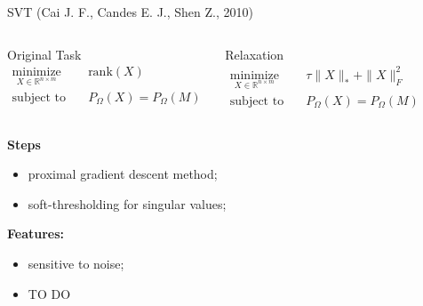 \documentclass{beamer}
\begin{document}
\begin{frame}{SVT (Cai J. F., Candes E. J., Shen Z., 2010)}
	\begin{columns}[c]
		\begin{block}{Original Task}
			\vspace{-0.5cm}
			\begin{align*}
			\mathop{\text{minimize}}\limits_{X \in \mathbb{R}^{n \times m}} \quad & 
			\text{rank} (X) \\
			\text{subject to} \quad & P_{\Omega} (X) = P_{\Omega} (M)
			\end{align*}
		\end{block}
		
		\begin{block}{Relaxation}
			\vspace{-0.5cm}
			\begin{align*}
			\mathop{\text{minimize}}\limits_{X \in \mathbb{R}^{n \times m}} \quad & \tau \| X \|_* + \| X \|_F^2 \\
			\text{subject to} \quad & P_{\Omega} (X) = P_{\Omega} (M)
			\end{align*}
		\end{block}
	\end{columns}
	\vspace{0.3cm}
	\textbf{Steps}
	
	\begin{itemize}
		\item proximal gradient descent method;
		\item soft-thresholding for singular values;
	\end{itemize}
	\textbf{Features:}
	\begin{itemize}
		\item sensitive to noise;
		\item TO DO
	\end{itemize}
	
\end{frame}
\end{document}
